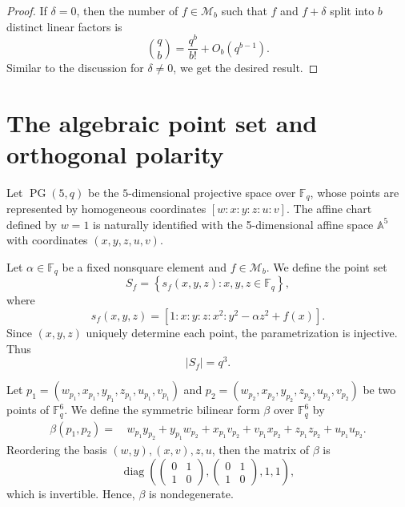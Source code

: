 \documentclass[11pt,a4paper]{article}
\theoremstyle{definition}
\theoremstyle{remark}
\newcommand{\PG}{\operatorname{PG}}
\begin{document}
\begin{proof}
If $\delta = 0$, then the number of $f \in \mathcal{M}_b$ such that $f$ and $f+\delta$ split into $b$ distinct linear factors is 
$$\binom{q}{b} = \frac{q^b}{b!} + O_b(q^{b-1}).$$
Similar to the discussion for $\delta\neq 0$, we get the desired result.
\end{proof}



\section{The algebraic point set and orthogonal polarity}
\label{sec:point-set}

 

Let $\PG(5,q)$ be the $5$-dimensional projective space over $\mathbb{F}_q$, whose points are represented by homogeneous coordinates $[w:x:y:z:u:v]$. The affine chart defined by $w = 1$ is naturally identified with the 5-dimensional affine space $\mathbb{A}^5$ with coordinates $(x,y,z,u,v)$.

Let $\alpha \in \mathbb{F}_q$ be a fixed nonsquare element and $f \in \mathcal{M}_b$. We define the point set
\[
S_f = \left\{ s_f(x, y, z) : x, y, z \in \mathbb{F}_q \right\},
\]
where 
\begin{equation}\label{exKabK3b+1-equation3}
    s_f(x, y, z) = \left[ 1 : x : y : z : x^2 : y^2 - \alpha z^2 + f(x) \right].
\end{equation}
Since $(x,y,z)$ uniquely determine each point, the parametrization is injective. Thus
\[
|S_f| = q^3.
\]

Let $p_1=(w_{p_1},x_{p_1},y_{p_1},z_{p_1},u_{p_1},v_{p_1})$ and $p_2=(w_{p_2},x_{p_2},y_{p_2},z_{p_2},u_{p_2},v_{p_2})$ be two points of $\mathbb{F}_q^6$.
We define the symmetric bilinear form $\beta$ over $\mathbb{F}_q^6$ by 
\[
\begin{aligned}
\beta(p_1, p_2) = \, & w_{p_1} y_{p_2} + y_{p_1} w_{p_2} + x_{p_1} v_{p_2} + v_{p_1} x_{p_2} +z_{p_1} z_{p_2} + u_{p_1} u_{p_2}.
\end{aligned}
\]
Reordering the basis $(w,y), (x,v), z, u$, then the matrix of $\beta$ is
$$
\operatorname{diag}\left(\begin{pmatrix}0&1\\1&0\end{pmatrix},\begin{pmatrix}0&1\\1&0\end{pmatrix},1,1\right),
$$
which is invertible. Hence, $\beta$ is nondegenerate.
\end{document}
